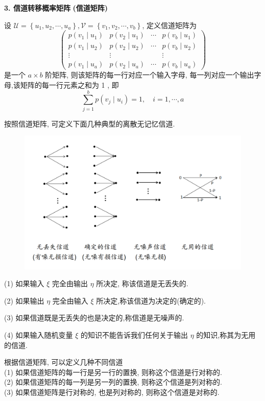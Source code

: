 \textbf{3. 信道转移概率矩阵} \textbf{(信道矩阵)}

设 $ \mathscr{U}=\left\{u_{1}, u_{2}, \cdots, u_{a}\right\}, \mathscr{V}=\left\{v_{1}, v_{2}, \cdots, v_{b}\right\} $, 定义信道矩阵为
$$
\left(\begin{array}{cccc}
p\left(v_{1} \mid u_{1}\right) & p\left(v_{2} \mid u_{1}\right) & \cdots & p\left(v_{b} \mid u_{1}\right) \\
p\left(v_{1} \mid u_{2}\right) & p\left(v_{2} \mid u_{2}\right) & \cdots & p\left(v_{b} \mid u_{2}\right) \\
\vdots & \vdots & & \vdots \\
p\left(v_{1} \mid u_{a}\right) & p\left(v_{2} \mid u_{a}\right) & \cdots & p\left(v_{b} \mid u_{a}\right)
\end{array}\right)
$$
是一个 $ a \times b $ 阶矩阵, 则该矩阵的每一行对应一个输入字母, 每一列对应一个输出字母,该矩阵的每一行元素之和为 1 , 即
$$
\sum_{j=1}^{b} p\left(v_{j} \mid u_{i}\right)=1, \quad i=1, \cdots, a
$$

按照信道矩阵, 可定义下面几种典型的离散无记忆信道.
\begin{figure}[h]
    \centering
    \includegraphics[width=.6\linewidth]{image/6.png}
\end{figure}

\begin{definition}
    (1) 如果输入 $ \xi $ 完全由输出 $ \eta $ 所决定, 称该信道是无丢失的.
    
(2) 如果输出 $ \eta $ 完全由输入 $ \xi $ 所决定,称该信道为决定的(确定的).

(3) 如果信道既是无丢失的也是决定的,称信道是无噪声的.

(4) 如果输入随机变量 $ \xi $ 的知识不能告诉我们任何关于输出 $ \eta $ 的知识,称其为无用的信道.
\end{definition}

\begin{definition}
    根据信道矩阵, 可以定义几种不同信道\\
(1) 如果信道矩阵的每一行是另一行的置换, 则称这个信道是行对称的.\\
(2) 如果信道矩阵的每一列是另一列的置换, 则称这个信道是列对称的.\\
(3) 如果信道矩阵是行对称的, 也是列对称的, 则称这个信道是对称的.
\end{definition}
 

